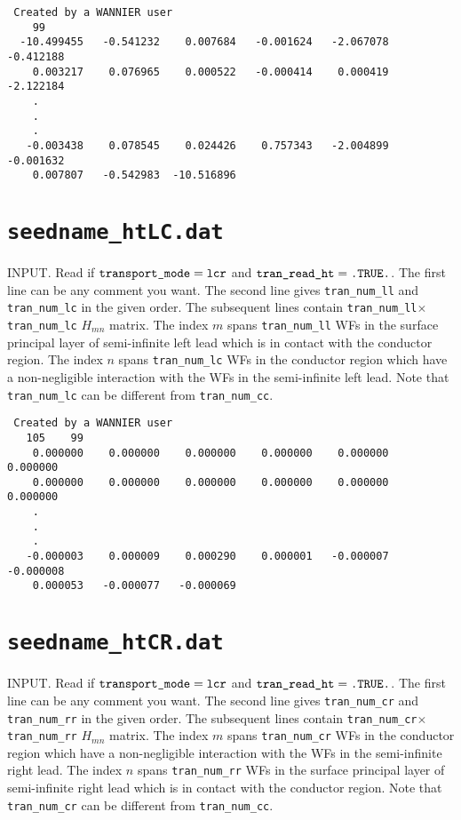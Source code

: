 \begin{verbatim}
 Created by a WANNIER user
    99
  -10.499455   -0.541232    0.007684   -0.001624   -2.067078   -0.412188
    0.003217    0.076965    0.000522   -0.000414    0.000419   -2.122184
    .
    .
    .
   -0.003438    0.078545    0.024426    0.757343   -2.004899   -0.001632
    0.007807   -0.542983  -10.516896
\end{verbatim}

\section{{\tt seedname\_htLC.dat}}

INPUT.
Read if $\verb#transport_mode#=\verb#lcr#$
and $\verb#tran_read_ht#=\verb#.TRUE.#$.
The first line can be any comment you want.
The second line gives
\verb#tran_num_ll#
and \verb#tran_num_lc#
in the given order.
The subsequent lines contain 
\verb#tran_num_ll#$\times$\verb#tran_num_lc#
$H_{mn}$ matrix.
The index $m$ spans \verb#tran_num_ll# WFs
in the surface principal layer of semi-infinite left lead
which is in contact with the conductor region.
The index $n$ spans \verb#tran_num_lc# WFs
in the conductor region which
have a non-negligible interaction with
the WFs in the semi-infinite left lead.
Note that \verb#tran_num_lc# 
can be different from \verb#tran_num_cc#.


\begin{verbatim}
 Created by a WANNIER user
   105    99
    0.000000    0.000000    0.000000    0.000000    0.000000    0.000000
    0.000000    0.000000    0.000000    0.000000    0.000000    0.000000
    .
    .
    .
   -0.000003    0.000009    0.000290    0.000001   -0.000007   -0.000008
    0.000053   -0.000077   -0.000069
\end{verbatim}

\section{{\tt seedname\_htCR.dat}}

INPUT.
Read if $\verb#transport_mode#=\verb#lcr#$
and $\verb#tran_read_ht#=\verb#.TRUE.#$.
The first line can be any comment you want.
The second line gives
\verb#tran_num_cr#
and \verb#tran_num_rr#
in the given order.
The subsequent lines contain 
\verb#tran_num_cr#$\times$\verb#tran_num_rr#
$H_{mn}$ matrix.
The index $m$ spans \verb#tran_num_cr# WFs
in the conductor region which
have a non-negligible interaction with
the WFs in the semi-infinite right lead.
The index $n$ spans \verb#tran_num_rr# WFs
in the surface principal layer of semi-infinite right lead
which is in contact with the conductor region.
Note that \verb#tran_num_cr# 
can be different from \verb#tran_num_cc#.

